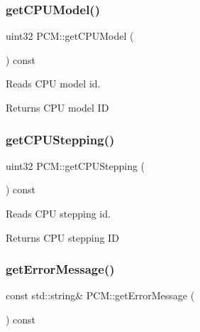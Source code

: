 \subsubsection{\texorpdfstring{get\+C\+P\+U\+Model()}{getCPUModel()}}
{\footnotesize\ttfamily uint32 P\+C\+M\+::get\+C\+P\+U\+Model (\begin{DoxyParamCaption}{ }\end{DoxyParamCaption}) const\hspace{0.3cm}{\ttfamily [inline]}}



Reads C\+PU model id. 

\begin{DoxyReturn}{Returns}
C\+PU model ID 
\end{DoxyReturn}
\mbox{\label{class_p_c_m_afcf71f98767227aa64821a715bfab099}} 
\subsubsection{\texorpdfstring{get\+C\+P\+U\+Stepping()}{getCPUStepping()}}
{\footnotesize\ttfamily uint32 P\+C\+M\+::get\+C\+P\+U\+Stepping (\begin{DoxyParamCaption}{ }\end{DoxyParamCaption}) const\hspace{0.3cm}{\ttfamily [inline]}}



Reads C\+PU stepping id. 

\begin{DoxyReturn}{Returns}
C\+PU stepping ID 
\end{DoxyReturn}
\mbox{\label{class_p_c_m_afbb527aac9b4a15b5437bbfc3111cdeb}} 
\subsubsection{\texorpdfstring{get\+Error\+Message()}{getErrorMessage()}}
{\footnotesize\ttfamily const std\+::string\& P\+C\+M\+::get\+Error\+Message (\begin{DoxyParamCaption}{ }\end{DoxyParamCaption}) const\hspace{0.3cm}{\ttfamily [inline]}}



